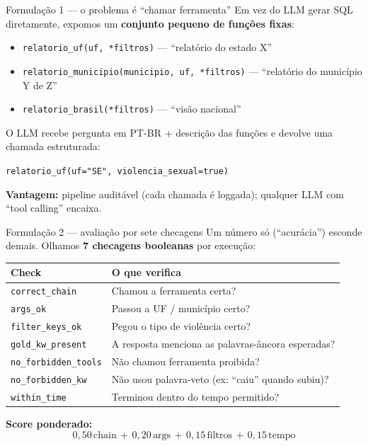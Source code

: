 \documentclass[10pt,aspectratio=169]{beamer}
\newcommand{\code}[1]{\texttt{\small #1}}
\begin{document}
\begin{frame}{Formulação 1 --- o problema é ``chamar ferramenta''}
Em vez do LLM gerar SQL diretamente, expomos um \textbf{conjunto
pequeno de funções fixas}:

\begin{itemize}\small
\item \code{relatorio\_uf(uf, *filtros)} --- ``relatório do estado X''
\item \code{relatorio\_municipio(municipio, uf, *filtros)} --- ``relatório
do município Y de Z''
\item \code{relatorio\_brasil(*filtros)} --- ``visão nacional''
\end{itemize}

\vspace{0.4em}
O LLM recebe pergunta em PT-BR + descrição das funções e devolve
uma chamada estruturada:
\begin{center}
\code{relatorio\_uf(uf="SE", violencia\_sexual=true)}
\end{center}

\vspace{0.3em}
\small
\textbf{Vantagem:} pipeline auditável (cada chamada é loggada);
qualquer LLM com ``tool calling'' encaixa.
\end{frame}

\begin{frame}{Formulação 2 --- avaliação por sete checagens}
Um número só (``acurácia'') esconde demais. Olhamos \textbf{7
checagens booleanas} por execução:

\centering\footnotesize
\begin{tabularx}{0.92\textwidth}{@{}l X@{}}
\toprule
\textbf{Check} & \textbf{O que verifica} \\
\midrule
\code{correct\_chain}      & Chamou a ferramenta certa? \\
\code{args\_ok}            & Passou a UF / município certo? \\
\code{filter\_keys\_ok}    & Pegou o tipo de violência certo? \\
\code{gold\_kw\_present}   & A resposta menciona as palavras-âncora esperadas? \\
\code{no\_forbidden\_tools}& Não chamou ferramenta proibida? \\
\code{no\_forbidden\_kw}   & Não usou palavra-veto (ex: ``caiu'' quando subiu)? \\
\code{within\_time}        & Terminou dentro do tempo permitido? \\
\bottomrule
\end{tabularx}

\vspace{0.4em}
\small
\textbf{Score ponderado:}
\[
0{,}50\,\text{chain}\,+\,0{,}20\,\text{args}\,+\,0{,}15\,\text{filtros}\,+\,0{,}15\,\text{tempo}
\]
\end{frame}
\end{document}
